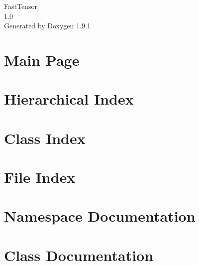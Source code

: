 \let\mypdfximage\pdfximage\def\pdfximage{\immediate\mypdfximage}\documentclass[twoside]{book}
\newcommand{\+}{\discretionary{\mbox{\scriptsize$\hookleftarrow$}}{}{}}
\newcommand{\clearemptydoublepage}{%
  \newpage{\pagestyle{empty}\cleardoublepage}%
}
\begin{document}
\raggedbottom

\hypersetup{pageanchor=false,
             bookmarksnumbered=true,
             pdfencoding=unicode
            }
\begin{titlepage}
\vspace*{7cm}
\begin{center}%
{\Large Fast\+Tensor \\[1ex]\large 1.\+0 }\\
\vspace*{1cm}
{\large Generated by Doxygen 1.9.1}\\
\end{center}
\end{titlepage}
\clearemptydoublepage
{}
\tableofcontents
\clearemptydoublepage
{}
\hypersetup{pageanchor=true}

\chapter{Main Page}
\label{index}\hypertarget{index}{}
\chapter{Hierarchical Index}

\chapter{Class Index}

\chapter{File Index}

\chapter{Namespace Documentation}

\chapter{Class Documentation}






















\end{document}
